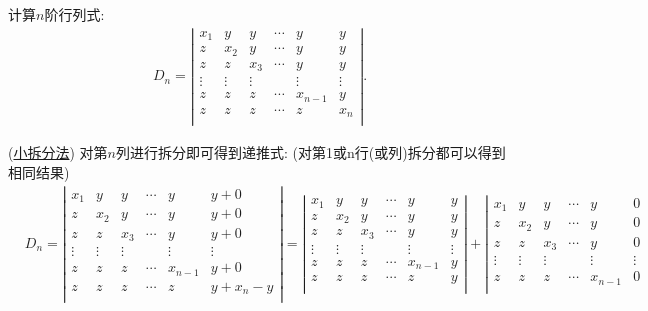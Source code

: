 \documentclass[lang=cn,newtx,10pt,scheme=chinese]{elegantbook}
\begin{document}
\begin{proposition}\label{proposition:小拆分法经典例题}
计算$n$阶行列式:
\begin{align}
D_n=\left| \begin{matrix}
x_1&		y&		y&		\cdots&		y&		y\\
z&		x_2&		y&		\cdots&		y&		y\\
z&		z&		x_3&		\cdots&		y&		y\\
\vdots&		\vdots&		\vdots&		&		\vdots&		\vdots\\
z&		z&		z&		\cdots&		x_{n-1}&		y\\
z&		z&		z&		\cdots&		z&		x_n\\
\end{matrix} \right|.
\nonumber
\end{align}
\end{proposition}
\begin{solution}(\hyperref[小拆分法]{小拆分法})
对第$n$列进行拆分即可得到递推式:
(对第1或n行(或列)拆分都可以得到相同结果)
\begin{align}
&D_n=\left| \begin{matrix}
x_1&		y&		y&		\cdots&		y&		y+0\\
z&		x_2&		y&		\cdots&		y&		y+0\\
z&		z&		x_3&		\cdots&		y&		y+0\\
\vdots&		\vdots&		\vdots&		&		\vdots&		\vdots\\
z&		z&		z&		\cdots&		x_{n-1}&		y+0\\
z&		z&		z&		\cdots&		z&		y+x_n-y\\
\end{matrix} \right|=\left| \begin{matrix}
x_1&		y&		y&		\cdots&		y&		y\\
z&		x_2&		y&		\cdots&		y&		y\\
z&		z&		x_3&		\cdots&		y&		y\\
\vdots&		\vdots&		\vdots&		&		\vdots&		\vdots\\
z&		z&		z&		\cdots&		x_{n-1}&		y\\
z&		z&		z&		\cdots&		z&		y\\
\end{matrix} \right|+\left| \begin{matrix}
x_1&		y&		y&		\cdots&		y&		0\\
z&		x_2&		y&		\cdots&		y&		0\\
z&		z&		x_3&		\cdots&		y&		0\\
\vdots&		\vdots&		\vdots&		&		\vdots&		\vdots\\
z&		z&		z&		\cdots&		x_{n-1}&		0\\

\end{matrix}
\end{align}
\end{solution}
\end{document}
